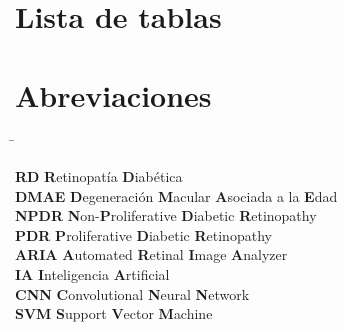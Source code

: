 \documentclass[
  12pt,
  spanish,
  a4paperpaper,
]{report}
\begin{document}
\setcounter{page}{2}

\newpage

\hypertarget{lista-de-tablas}{%
\chapter*{Lista de tablas}\label{lista-de-tablas}}

\renewcommand{\listtablename}{}
\listoftables

\setcounter{page}{3}

\newpage

\hypertarget{abreviaciones}{%
\chapter*{Abreviaciones}\label{abreviaciones}}

\begin{tabbing}
\hspace{1.0in} \= \hspace{1.5in}  \kill

\textbf{RD}   \> \textbf{R}etinopatía \textbf{D}iabética \\

\textbf{DMAE} \> \textbf{D}egeneración \textbf{M}acular
                 \textbf{A}sociada a la \textbf{E}dad \\

\textbf{NPDR} \> \textbf{N}on-\textbf{P}roliferative
                 \textbf{D}iabetic \textbf{R}etinopathy \\

\textbf{PDR}  \> \textbf{P}roliferative  \textbf{D}iabetic
                 \textbf{R}etinopathy \\

\textbf{ARIA} \> \textbf{A}utomated \textbf{R}etinal
                 \textbf{I}mage \textbf{A}nalyzer \\

\textbf{IA}   \> \textbf{I}nteligencia \textbf{A}rtificial \\

\textbf{CNN}  \> \textbf{C}onvolutional \textbf{N}eural
                 \textbf{N}etwork \\

\textbf{SVM}  \> \textbf{S}upport \textbf{V}ector \textbf{M}achine \\

\end{tabbing}
\end{document}
